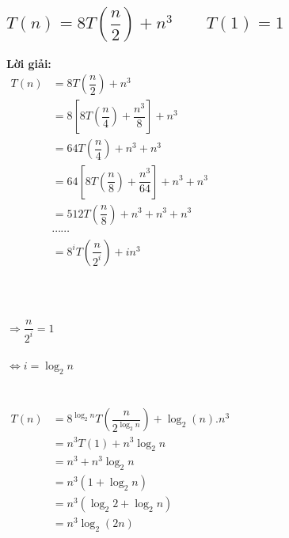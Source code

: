 \documentclass[12pt, letterpaper]{article}
\begin{document}
\subsection{$T(n) = 8T(\dfrac{n}{2}) + n^3 \quad \quad T(1) = 1$}
\textbf{Lời giải:} \\
$ \begin{aligned}
    T(n) &= 8T(\dfrac{n}{2}) + n^3 \\
        &= 8[8T(\dfrac{n}{4}) + \dfrac{n^3}{8}] + n^3 \\
        &= 64T(\dfrac{n}{4}) + n^3 + n^3 \\
        &= 64[8T(\dfrac{n}{8}) + \dfrac{n^3}{64}] + n^3 + n^3 \\
        &= 512T(\dfrac{n}{8}) + n^3 + n^3 + n^3 \\
        &\cdots \cdots \\
        &= 8^iT(\dfrac{n}{2^i}) + in^3 \\
\end{aligned} $ \\ \\ \\
 \\
$\Rightarrow \dfrac{n}{2^i} = 1$ \\ \\
$\Leftrightarrow i = \log_2{n}$ \\ \\
 \\
$ \begin{aligned}
    T(n) &= 8^{\log_2{n}}T(\dfrac{n}{2^{\log_2{n}}}) + \log_2(n).n^3 \\
        &= n^3T(1) + n^3\log_2{n} \\
        &= n^3 + n^3\log_2{n} \\
        &= n^3(1 + \log_2{n}) \\
        &= n^3(\log_2{2} + \log_2{n}) \\
        &= n^3\log_2(2n)
\end{aligned} $\\
\end{document}
